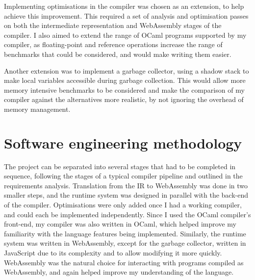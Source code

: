 
Implementing optimisations in the compiler was chosen as an extension, to help achieve this improvement. This required a set of analysis and optimisation passes on both the intermediate representation and WebAssembly stages of the compiler. I also aimed to extend the range of OCaml programs supported by my compiler, as floating-point and reference operations increase the range of benchmarks that could be considered, and would make writing them easier. 

Another extension was to implement a garbage collector, using a shadow stack to make local variables accessible during garbage collection. This would allow more memory intensive benchmarks to be considered and make the comparison of my compiler against the alternatives more realistic, by not ignoring the overhead of memory management. %



\section{Software engineering methodology}

The project can be separated into several stages that had to be completed in sequence, following the stages of a typical compiler pipeline and outlined in the requirements analysis. Translation from the IR to WebAssembly was done in two smaller steps, and the runtime system was designed in parallel with the back-end of the compiler. Optimisations were only added once I had a working compiler, and could each be implemented independently. Since I used the OCaml compiler's front-end, my compiler was also written in OCaml, which helped improve my familiarity with the language features being implemented. Similarly, the runtime system was written in WebAssembly, except for the garbage collector, written in JavaScript due to its complexity and to allow modifying it more quickly. WebAssembly was the natural choice for interacting with programs compiled as WebAssembly, and again helped improve my understanding of the language.

